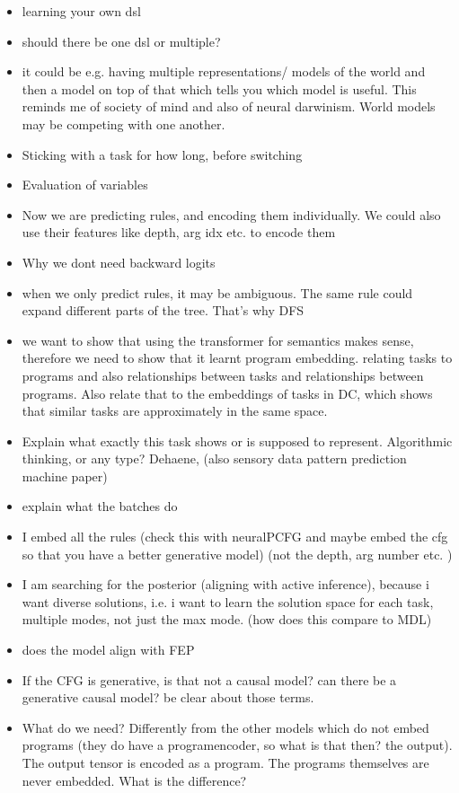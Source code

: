 \begin{itemize}
    \item learning your own dsl
    \item should there be one dsl or multiple?
    \item it could be e.g. having multiple representations/ models of the world and then a model on top of that which tells you which model is useful. This reminds me of society of mind and also of neural darwinism. World models may be competing with one another. 
    \item Sticking with a task for how long, before switching
    \item Evaluation of variables
    \item Now we are predicting rules, and encoding them individually. We could also use their features like depth, arg idx etc. to encode them 
    \item Why we dont need backward logits
    \item when we only predict rules, it may be ambiguous. The same rule could expand different parts of the tree. That's why DFS
    \item we want to show that using the transformer for semantics makes sense, therefore we need to show that it learnt program embedding. relating tasks to programs and also relationships between tasks and relationships between programs. Also relate that to the embeddings of tasks in DC, which shows that similar tasks are approximately in the same space.
    \item Explain what exactly this task shows or is supposed to represent. Algorithmic thinking, or any type? Dehaene, (also sensory data pattern prediction machine paper)
    \item explain what the batches do
    \item I embed all the rules (check this with neuralPCFG and maybe embed the cfg so that you have a better generative model) (not the depth, arg number etc. )
    \item I am searching for the posterior (aligning with active inference), because i want diverse solutions, i.e. i want to learn the solution space for each task, multiple modes, not just the max mode. (how does this compare to MDL)
    \item does the model align with FEP
    \item If the CFG is generative, is that not a causal model? can there be a generative causal model? be clear about those terms. 
    \item What do we need? Differently from the other models which do not embed programs (they do have a programencoder, so what is that then? the output). The output tensor is encoded as a program. The programs themselves are never embedded. What is the difference?

\end{itemize}
